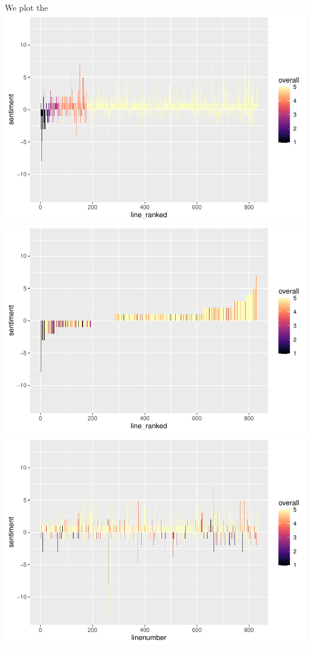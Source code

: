 \documentclass[
  11pt,
]{article}
\begin{document}
We plot the
\includegraphics{Assignment-STAT702_files/figure-latex/sentiment_plot-1.pdf}
\includegraphics{Assignment-STAT702_files/figure-latex/sentiment_plot-2.pdf}
\includegraphics{Assignment-STAT702_files/figure-latex/sentiment_plot-3.pdf}
\end{document}
